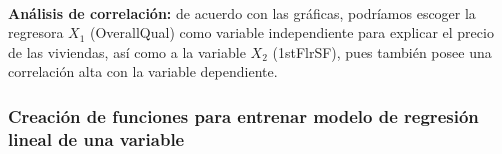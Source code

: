 \documentclass[11pt]{article}
\begin{document}
    \begin{center}
    \end{center}
    { \hspace*{\fill} \\}
    
    \textbf{Análisis de correlación:} de acuerdo con las gráficas, podríamos
escoger la regresora \(X_1\) (OverallQual) como variable independiente
para explicar el precio de las viviendas, así como a la variable \(X_2\)
(1stFlrSF), pues también posee una correlación alta con la variable
dependiente.

    \hypertarget{creaciuxf3n-de-funciones-para-entrenar-modelo-de-regresiuxf3n-lineal-de-una-variable}{%
\subsubsection{Creación de funciones para entrenar modelo de regresión
lineal de una
variable}\label{creaciuxf3n-de-funciones-para-entrenar-modelo-de-regresiuxf3n-lineal-de-una-variable}}
\end{document}
